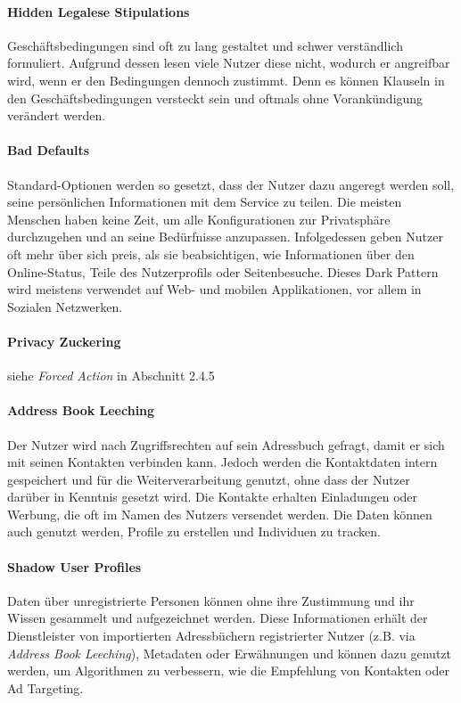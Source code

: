\documentclass[a4paper]{article}
\begin{document}
\paragraph{Hidden Legalese Stipulations}
Geschäftsbedingungen sind oft zu lang gestaltet und schwer verständlich formuliert. Aufgrund dessen lesen viele Nutzer diese nicht, wodurch er angreifbar wird, wenn er den Bedingungen dennoch zustimmt. Denn es können Klauseln in den Geschäftsbedingungen versteckt sein und oftmals ohne Vorankündigung verändert werden.  

\paragraph{Bad Defaults}
Standard-Optionen werden so gesetzt, dass der Nutzer dazu angeregt werden soll, seine persönlichen Informationen mit dem Service zu teilen. Die meisten Menschen haben keine Zeit, um alle Konfigurationen zur Privatsphäre durchzugehen und an seine Bedürfnisse anzupassen. Infolgedessen geben Nutzer oft mehr über sich preis, als sie beabsichtigen, wie Informationen über den Online-Status, Teile des Nutzerprofils oder Seitenbesuche. Dieses Dark Pattern wird meistens verwendet auf Web- und mobilen Applikationen, vor allem in Sozialen Netzwerken.  

\paragraph{Privacy Zuckering}
siehe \textit{Forced Action} in Abschnitt 2.4.5

\paragraph{Address Book Leeching}
Der Nutzer wird nach Zugriffsrechten auf sein Adressbuch gefragt, damit er sich mit seinen Kontakten verbinden kann. Jedoch werden die Kontaktdaten intern gespeichert und für die Weiterverarbeitung genutzt, ohne dass der Nutzer darüber in Kenntnis gesetzt wird. Die Kontakte erhalten Einladungen oder Werbung, die oft im Namen des Nutzers versendet werden. Die Daten können auch genutzt werden, Profile zu erstellen und Individuen zu tracken.

\paragraph{Shadow User Profiles}
Daten über unregistrierte Personen können ohne ihre Zustimmung und ihr Wissen gesammelt und aufgezeichnet werden. Diese Informationen erhält der Dienstleister von importierten Adressbüchern registrierter Nutzer (z.B. via \textit{Address Book Leeching}), Metadaten oder Erwähnungen und können dazu genutzt werden, um Algorithmen zu verbessern, wie die Empfehlung von Kontakten oder Ad Targeting.
\end{document}
